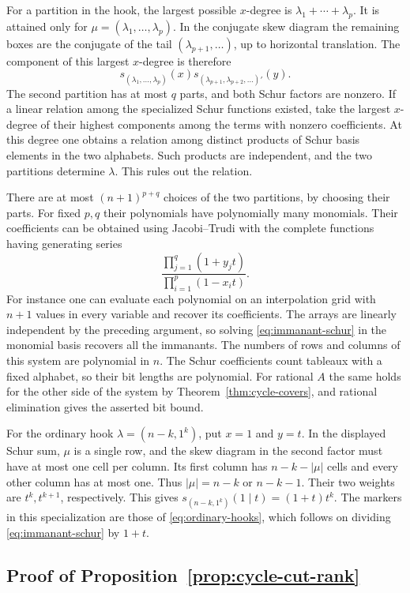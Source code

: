 \documentclass[11pt,reqno]{amsart}
\theoremstyle{remark}
\numberwithin{equation}{section}
\begin{document}
For a partition in the hook, the largest possible \(x\)-degree is
\(\lambda_1+\cdots+\lambda_p\). It is attained only for
\(\mu=(\lambda_1,\ldots,\lambda_p)\). In the conjugate skew diagram the
remaining boxes are the conjugate of the tail \((\lambda_{p+1},\ldots)\),
up to horizontal translation. The component of this largest \(x\)-degree
is therefore
\[
 s_{(\lambda_1,\ldots,\lambda_p)}(x)
 s_{(\lambda_{p+1},\lambda_{p+2},\ldots)'}(y).
\]
The second partition has at most \(q\) parts, and both Schur factors are
nonzero. If a linear relation among the specialized Schur functions
existed, take the largest \(x\)-degree of their highest components among
the terms with nonzero coefficients. At this degree one obtains a
relation among distinct products of Schur basis elements in the two
alphabets. Such products are independent, and the two partitions
determine \(\lambda\). This rules out the relation.

There are at most \((n+1)^{p+q}\) choices of the two partitions, by
choosing their parts. For fixed \(p,q\) their polynomials have
polynomially many monomials. Their coefficients can be obtained using
Jacobi--Trudi with the complete functions having generating series
\[
 \frac{\prod_{j=1}^q(1+y_j t)}{\prod_{i=1}^p(1-x_i t)} .
\]
For instance one can evaluate each polynomial on an interpolation grid
with \(n+1\) values in every variable and recover its coefficients. The
arrays are linearly independent by the preceding argument, so solving
\eqref{eq:immanant-schur} in the monomial basis recovers all the
immanants. The numbers of rows and columns of this system are polynomial
in \(n\). The Schur coefficients count tableaux with a fixed alphabet, so
their bit lengths are polynomial. For rational \(A\) the same holds for
the other side of the system by Theorem~\ref{thm:cycle-covers}, and
rational elimination gives the asserted bit bound.

For the ordinary hook \(\lambda=(n-k,1^k)\), put \(x=1\) and \(y=t\). In
the displayed Schur sum, \(\mu\) is a single row, and the skew diagram in
the second factor must have at most one cell per column. Its first column
has \(n-k-|\mu|\) cells and every other column has at most one. Thus
\(|\mu|=n-k\) or \(n-k-1\). Their two weights are \(t^k,t^{k+1}\),
respectively. This gives \(s_{(n-k,1^k)}(1\mid t)=(1+t)t^k\). The markers
in this specialization are those of \eqref{eq:ordinary-hooks}, which
follows on dividing \eqref{eq:immanant-schur} by \(1+t\).

\subsection{Proof of Proposition~\ref{prop:cycle-cut-rank}}
\end{document}
